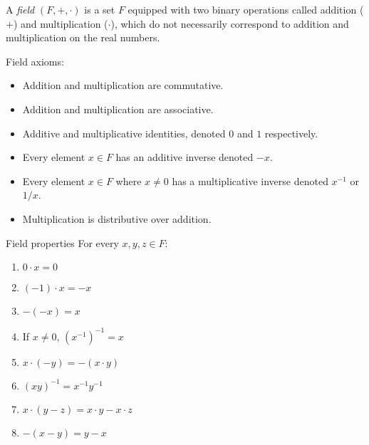\documentclass[12pt]{article}
\begin{document}
\begin{defn}
    A \emph{field} $(F, +, \cdot)$ is a set $F$ equipped with two binary operations called addition ($+$) and multiplication ($\cdot$), which do not necessarily correspond to addition and multiplication on the real numbers.

    Field axioms:
    \begin{itemize}
        \item Addition and multiplication are commutative.
        \item Addition and multiplication are associative.
        \item Additive and multiplicative identities, denoted $0$ and $1$ respectively.
        \item Every element $x \in F$ has an additive inverse denoted $-x$.
        \item Every element $x \in F$ where $x \neq 0$ has a multiplicative inverse denoted $x^{-1}$ or $1/x$.
        \item Multiplication is distributive over addition.
    \end{itemize}
\end{defn}

\begin{thm}{Field properties}\label{field-properties}\proofbreak
    For every $x, y, z \in F$:
    \begin{enumerate}
        \item $0 \cdot x = 0$
        \item $(-1) \cdot x = -x$
        \item $-(-x) = x$
        \item If $x \neq 0$, $\left(x^{-1}\right)^{-1} = x$
        \item $x \cdot (-y) = -(x\cdot y)$
        \item $(xy)^{-1} = x^{-1}y^{-1}$
        \item $x\cdot(y-z) = x\cdot y - x \cdot z$
        \item $-(x - y) = y - x$
    \end{enumerate}
\end{thm}
\end{document}
